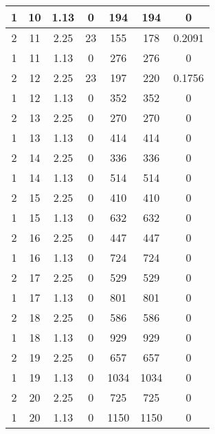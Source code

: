 \documentclass[letterpaper, 12pt]{article}
\begin{document}
\begin{longtable}{|c|c|c|c|c|c|c|}
\hline
1 & 10 & 1.13 & 0 & 194 & 194 & 0 \\
\hline
2 & 11 & 2.25 & 23 & 155 & 178 & 0.2091 \\
\hline
1 & 11 & 1.13 & 0 & 276 & 276 & 0 \\
\hline
2 & 12 & 2.25 & 23 & 197 & 220 & 0.1756 \\
\hline
1 & 12 & 1.13 & 0 & 352 & 352 & 0 \\
\hline
2 & 13 & 2.25 & 0 & 270 & 270 & 0 \\
\hline
1 & 13 & 1.13 & 0 & 414 & 414 & 0 \\
\hline
2 & 14 & 2.25 & 0 & 336 & 336 & 0 \\
\hline
1 & 14 & 1.13 & 0 & 514 & 514 & 0 \\
\hline
2 & 15 & 2.25 & 0 & 410 & 410 & 0 \\
\hline
1 & 15 & 1.13 & 0 & 632 & 632 & 0 \\
\hline
2 & 16 & 2.25 & 0 & 447 & 447 & 0 \\
\hline
1 & 16 & 1.13 & 0 & 724 & 724 & 0 \\
\hline
2 & 17 & 2.25 & 0 & 529 & 529 & 0 \\
\hline
1 & 17 & 1.13 & 0 & 801 & 801 & 0 \\
\hline
2 & 18 & 2.25 & 0 & 586 & 586 & 0 \\
\hline
1 & 18 & 1.13 & 0 & 929 & 929 & 0 \\
\hline
2 & 19 & 2.25 & 0 & 657 & 657 & 0 \\
\hline
1 & 19 & 1.13 & 0 & 1034 & 1034 & 0 \\
\hline
2 & 20 & 2.25 & 0 & 725 & 725 & 0 \\
\hline
1 & 20 & 1.13 & 0 & 1150 & 1150 & 0 \\
\hline
\end{longtable}
\end{document}
